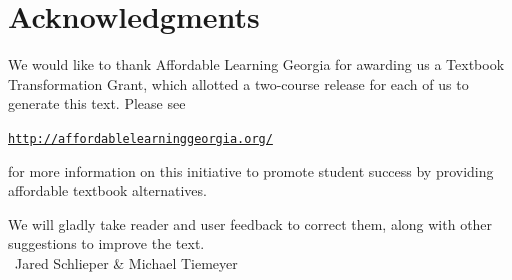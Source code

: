 \section*{Acknowledgments}

We would like to thank Affordable Learning Georgia for awarding us a Textbook Transformation Grant, which allotted a two-course release for each of us to generate this text.  Please see
\begin{center}
\href{http://affordablelearninggeorgia.org/}{\texttt{http://affordablelearninggeorgia.org/}}
\end{center} 
for more information on this initiative to promote student success by providing affordable textbook alternatives.

We will gladly take reader and user feedback to correct them, along with other suggestions to improve the text. \\

\ \hfill Jared Schlieper \& Michael Tiemeyer
 
